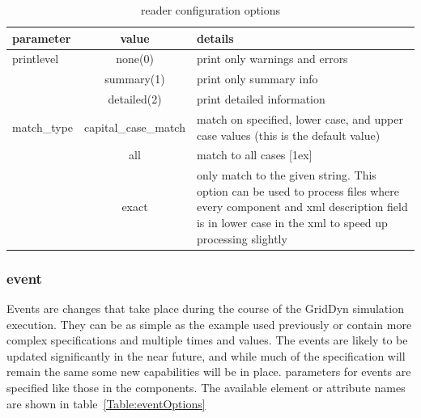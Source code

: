 \documentclass[12pt]{article} %
\begin{document}
 \begin{table}[ht]
 	
 	\caption{reader configuration options} %
 	\centering %
 	\begin{tabular}{l c p{8cm}} %
 		\hline %
 		parameter & value & details \\ [0.5ex] %
 		\hline %
 		printlevel & none(0) & print only warnings and errors \\ %
 		 & summary(1) & print only summary info \\
 		 & detailed(2) & print detailed information  \\
 		match\_type & capital\_case\_match & match on specified, lower case, and upper case values (this is the default value) \\
 		& all & match to all cases [1ex] \\
 		& exact & only match to the given string.  This option can be used to process files where every component and xml description field is in lower case in the xml to speed up processing slightly \\%
 		\hline %
 	\end{tabular}
 	\label{Table:configOptions}
 \end{table} 
 
 \subsubsection{event}
 Events are changes that take place during the course of the GridDyn simulation execution.  They can be as simple as the example used previously or contain more complex specifications and multiple times and values.  The events are likely to be updated significantly in the near future, and while much of the specification will remain the same some new capabilities will be in place.  
 parameters for events are specified like those in the components.  The available element or attribute names are shown in table~\ref{Table:eventOptions}
 
\end{document}
